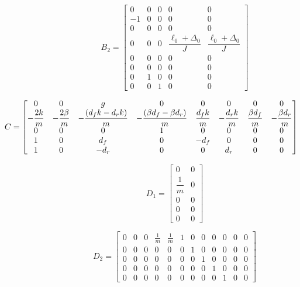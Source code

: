 \documentclass[]{report}
\begin{document}
	
	\begin{equation}
		B_2 =
		\begin{bmatrix}
			0 & 0 & 0 & 0 & 0 \\
			-1 & 0 & 0 & 0 & 0 \\
			0 & 0 & 0 & 0 & 0 \\
			0 & 0 & 0 & \dfrac{\ell_0 +\Delta_0}{J} & \dfrac{\ell_0 +\Delta_0}{J} \\
			0 & 0 & 0 & 0 & 0 \\
			0 & 0 & 0 & 0 & 0 \\
			0 & 1 & 0 & 0 & 0 \\
			0 & 0 & 1 & 0 & 0
		\end{bmatrix}
	\end{equation}
	
	
\begin{equation}
	\hspace*{-2cm}
	C =
	\begin{bmatrix}
		0 & 0 & g & 0 & 0 & 0 & 0 & 0 \\
		-\dfrac{2k}{m} & -\dfrac{2\beta}{m} & -\dfrac{(d_f k - d_r k)}{m} & -\dfrac{(\beta d_f - \beta d_r)}{m} & \dfrac{d_f k}{m} & -\dfrac{d_r k}{m} & \dfrac{\beta d_f}{m} & -\dfrac{\beta d_r}{m} \\
		0 & 0 & 0 & 1 & 0 & 0 & 0 & 0 \\
		1 & 0 & d_f & 0 & -d_f & 0 & 0 & 0 \\
		1 & 0 & -d_r & 0 & 0 & d_r & 0 & 0
	\end{bmatrix}
\end{equation}

	
	
\begin{equation}
	D_1 =
	\begin{bmatrix}
		0 & 0 \\
		\dfrac{1}{m} & 0 \\
		0 & 0 \\
		0 & 0 \\
		0 & 0
	\end{bmatrix}
\end{equation}

	
	
\begin{equation}
D_2 =
	\left[\begin{array}{cccccccccccc} 0 & 0 & 0 & \frac{1}{m} & \frac{1}{m} & 1 & 0 & 0 & 0 & 0 & 0 & 0\\ 0 & 0 & 0 & 0 & 0 & 0 & 1 & 0 & 0 & 0 & 0 & 0\\ 0 & 0 & 0 & 0 & 0 & 0 & 0 & 1 & 0 & 0 & 0 & 0\\ 0 & 0 & 0 & 0 & 0 & 0 & 0 & 0 & 1 & 0 & 0 & 0\\ 0 & 0 & 0 & 0 & 0 & 0 & 0 & 0 & 0 & 1 & 0 & 0 
	\end{array}\right]
\end{equation}
\end{document}
